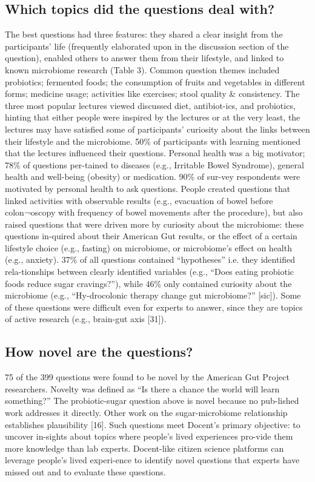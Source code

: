 \subsection{Which topics did the questions deal with?}
The best questions had three features: they shared a clear insight from the participants’ life (frequently elaborated upon in the discussion section of the question), enabled others to answer them from their lifestyle, and linked to known microbiome research (Table 3). Common question themes included probiotics; fermented foods; the consumption of fruits and vegetables in different forms; medicine usage; activities like exercises; stool quality \& consistency. The three most popular lectures viewed discussed diet, antibiot-ics, and probiotics, hinting that either people were inspired by the lectures or at the very least, the lectures may have satisfied some of participants’ curiosity about the links between their lifestyle and the microbiome. 50\% of participants with learning mentioned that the lectures influenced their questions.
Personal health was a big motivator; 78\% of questions per-tained to diseases (e.g., Irritable Bowel Syndrome), general health and well-being (obesity) or medication. 90\% of sur-vey respondents were motivated by personal health to ask questions. People created questions that linked activities with observable results (e.g., evacuation of bowel before colon¬oscopy with frequency of bowel movements after the procedure), but also raised questions that were driven more by curiosity about the microbiome: these questions in-quired about their American Gut results, or the effect of a certain lifestyle choice (e.g., fasting) on microbiome, or microbiome’s effect on health (e.g., anxiety). 37\% of all questions contained “hypotheses” i.e. they identified rela-tionships between clearly identified variables (e.g., “Does eating probiotic foods reduce sugar cravings?”), while 46\% only contained curiosity about the microbiome (e.g., “Hy-drocolonic therapy change gut microbiome?” [sic]). Some of these questions were difficult even for experts to answer, since they are topics of active research (e.g., brain-gut axis [31]).

\subsection{How novel are the questions?}
75 of the 399 questions were found to be novel by the American Gut Project researchers. Novelty was defined as “Is there a chance the world will learn something?” The probiotic-sugar question above is novel because no pub-lished work addresses it directly. Other work on the sugar-microbiome relationship establishes plausibility [16]. Such questions meet Docent’s primary objective: to uncover in-sights about topics where people’s lived experiences pro-vide them more knowledge than lab experts. Docent-like citizen science platforms can leverage people’s lived experi-ence to identify novel questions that experts have missed out and to evaluate these questions.

